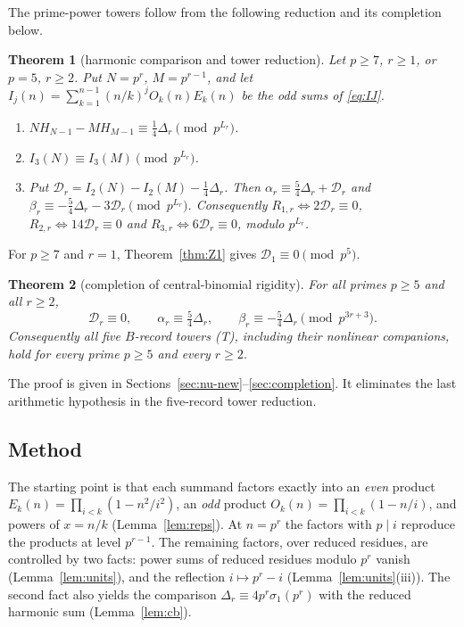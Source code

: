 \documentclass[11pt]{amsart}
\newtheorem{theorem}{Theorem}[section]
\theoremstyle{definition}
\theoremstyle{remark}
\begin{document}
The prime-power towers follow from the following reduction and its completion below.

\begin{theorem}[harmonic comparison and tower reduction]\label{thm:towers}
Let $p\ge7$, $r\ge1$, or $p=5$, $r\ge2$. Put $N=p^r$, $M=p^{r-1}$, and let
$I_j(n)=\sum_{k=1}^{n-1}(n/k)^jO_k(n)E_k(n)$ be the odd sums of \eqref{eq:IJ}.
\begin{enumerate}
\item[(a)] $N H_{N-1}-M H_{M-1}\equiv \tfrac14\Delta_r\pmod{p^{L_r}}$.
\item[(b)] $I_3(N)\equiv I_3(M)\pmod{p^{L_r}}$.
\item[(c)] Put $\mathcal D_r=I_2(N)-I_2(M)-\tfrac14\Delta_r$. Then
$\alpha_r\equiv\tfrac54\Delta_r+\mathcal D_r$ and $\beta_r\equiv-\tfrac54\Delta_r-3\mathcal D_r
\pmod{p^{L_r}}$. Consequently $R_{1,r}\Leftrightarrow 2\mathcal D_r\equiv0$,
$R_{2,r}\Leftrightarrow 14\mathcal D_r\equiv 0$ and $R_{3,r}\Leftrightarrow 6\mathcal D_r\equiv0$,
modulo $p^{L_r}$.
\end{enumerate}
\end{theorem}

For $p\ge7$ and $r=1$, Theorem~\ref{thm:Z1} gives $\mathcal D_1\equiv0\pmod{p^5}$.
\begin{theorem}[completion of central-binomial rigidity]\label{conj:D}
For all primes $p\ge5$ and all $r\ge2$,
\[
\mathcal D_r\equiv0,\qquad
\alpha_r\equiv\tfrac54\Delta_r,\qquad
\beta_r\equiv-\tfrac54\Delta_r\pmod{p^{3r+3}}.
\]
Consequently all five $B$-record towers (T), including their nonlinear companions,
hold for every prime $p\ge5$ and every $r\ge2$.
\end{theorem}
The proof is given in Sections~\ref{sec:nu-new}--\ref{sec:completion}.
It eliminates the last arithmetic hypothesis in the five-record tower reduction.

\subsection{Method}
The starting point is that each summand factors exactly into an \emph{even} product
$E_k(n)=\prod_{i<k}(1-n^2/i^2)$, an \emph{odd} product $O_k(n)=\prod_{i<k}(1-n/i)$, and powers
of $x=n/k$ (Lemma~\ref{lem:reps}). At $n=p^r$ the factors with $p\mid i$ reproduce the
products at level $p^{r-1}$. The remaining factors, over reduced residues, are controlled by
two facts: power sums of reduced residues modulo $p^r$ vanish (Lemma~\ref{lem:units}), and
the reflection $i\mapsto p^r-i$ (Lemma~\ref{lem:units}(iii)). The second fact also yields the
comparison $\Delta_r\equiv 4p^r\sigma_1(p^r)$ with the reduced harmonic sum
(Lemma~\ref{lem:cb}).
\end{document}
